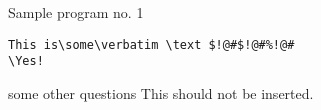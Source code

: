 \begin{chunk}{Sample program no. 1}
\begin{verbatim}
This is\some\verbatim \text $!@#$!@#%!@#
\Yes!
\end{verbatim}
\end{chunk}

\begin{chunk}{some other questions}
  This should not be inserted.
\end{chunk}


